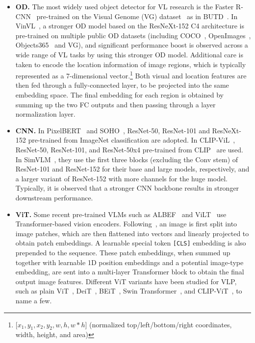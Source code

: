 \begin{itemize}[leftmargin=*]
    \item \textbf{OD.} The most widely used object detector for VL research is the Faster R-CNN~\citep{ren2015faster} pre-trained on the Visual Genome (VG) dataset~\citep{krishna2016visual} as in BUTD~\citep{anderson2018bottom}. 
    In VinVL~\citep{zhang2021vinvl}, a stronger OD model based on the ResNeXt-152 C4 architecture is pre-trained on multiple public OD datasets (including COCO~\citep{chen2015microsoftcoco}, OpenImages~\citep{kuznetsova2020open}, Objects365~\citep{shao2019objects365} and VG), and significant performance boost is observed across a wide range of VL tasks by using this stronger OD model. Additional care is taken to encode the location information of image regions, which is typically represented as a 7-dimensional vector.\footnote{[$x_1,y_1,x_2,y_2,w,h,w*h$] (normalized top/left/bottom/right coordinates, width, height, and area)} Both visual and location features are then fed through a fully-connected layer, to be projected into the same embedding space. The final embedding for each region is obtained by summing up the two FC outputs and then passing through a layer normalization layer.
    
    \item \textbf{CNN.} 
    In PixelBERT~\citep{huang2020pixel} and SOHO~\citep{huang2021seeing}, ResNet-50, ResNet-101 and ResNeXt-152 pre-trained from ImageNet classification are adopted. In CLIP-ViL~\citep{shen2021much}, ResNet-50, ResNet-101, and ResNet-50x4 pre-trained from CLIP~\citep{radford2021learning} are used. In SimVLM~\citep{wang2021simvlm}, they use the first three blocks (excluding the Conv stem) of ResNet-101 and ResNet-152 for their base and large models, respectively, and a larger variant of ResNet-152 with more channels for the huge model. Typically, it is observed that a stronger CNN backbone results in stronger downstream performance.
    \item \textbf{ViT.} Some recent pre-trained VLMs such as ALBEF~\citep{li2021align} and ViLT~\citep{kim2021vilt} use Transformer-based vision encoders. Following~\citet{dosovitskiy2020image}, an image is first split into image patches, which are then flattened into vectors and linearly projected to obtain patch embeddings. A learnable special token \texttt{[CLS]} embedding is also prepended to the sequence. These patch embeddings, when summed up together with learnable 1D position embeddings and a potential image-type embedding, are sent into a multi-layer Transformer block to obtain the final output image features.  
    Different ViT variants have been studied for VLP, such as plain ViT~\citep{dosovitskiy2020image}, DeiT~\citep{touvron2020deit}, BEiT~\citep{bao2021beit}, Swin Transformer~\citep{liu2021swin}, and  CLIP-ViT~\citep{radford2021learning}, to name a few.
\end{itemize}

